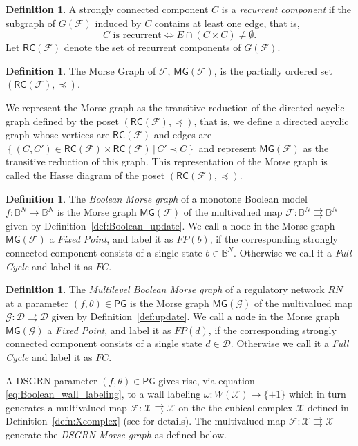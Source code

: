 \documentclass[12pt, notitlepage]{amsart}
\newcommand{\setdef}[2]{\left\{{#1}\,\left|\,{#2}\right.\right\}}
\newcommand{\cD}{\mathcal{D}}
\newcommand{\cF}{{\mathcal F}}
\newcommand{\cG}{{\mathcal G}}
\newcommand{\cX}{{\mathcal X}}
\theoremstyle{definition}
\newtheorem{defn}[thm]{Definition}
\newcommand{\PG}{\mathsf{PG}}
\newcommand{\bbB}{\mathbb{B}}
\newcommand{\RC}{\mathsf{RC}}
\newcommand{\MG}{\mathsf{MG}}
\begin{document}
  \begin{defn}
    A strongly connected component $C$ is a \emph{recurrent component} if the subgraph of $G(\cF)$ induced by $C$ contains at least one edge, that is,
    \[
      C \text{ is recurrent} \iff E \cap (C \times C) \neq \emptyset.
    \]
    Let $\RC(\cF)$ denote the set of recurrent components of $G(\cF)$.
  \end{defn}

  \begin{defn}
    The Morse Graph of $\cF$, $\MG(\cF)$, is the partially ordered set $(\RC(\cF), \preceq)$.
  \end{defn}

  We represent the Morse graph as the transitive reduction of the directed acyclic graph defined by the poset $(\RC(\cF), \preceq)$, that is, we define a directed acyclic graph whose vertices are $\RC(\cF)$ and edges are $\setdef{(C, C') \in \RC(\cF) \times \RC(\cF)}{C' \prec C}$ and represent $\MG(\cF)$ as the transitive reduction of this graph. This representation of the Morse graph is called the Hasse diagram of the poset $(\RC(\cF),\preceq)$.

  \begin{defn}
    \label{def:Boolean_MG}
    The \emph{Boolean Morse graph} of a monotone Boolean model $f \colon \bbB^N \to \bbB^N$ is the Morse graph $\MG(\cF)$ of the multivalued map $\cF \colon \bbB^N \rightrightarrows \bbB^N$ given by Definition~\ref{def:Boolean_update}. We call a node in the Morse graph $\MG(\cF)$ a \emph{Fixed Point}, and label it as $FP(b)$, if the corresponding strongly connected component consists of a single state $b \in \bbB^N$. Otherwise we call it a \emph{Full Cycle} and label it as $FC$.
  \end{defn}

  \begin{defn}
    \label{def:multi_Boolean_MG}
    The \emph{Multilevel Boolean Morse graph} of a regulatory network $RN$ at a parameter $(f, \theta) \in \PG$ is the Morse graph $\MG(\cG)$ of the multivalued map $\cG \colon \cD \rightrightarrows \cD$ given by Definition~\ref{def:update}. We call a node in the Morse graph $\MG(\cG)$ a \emph{Fixed Point}, and label it as $FP(d)$, if the corresponding strongly connected component consists of a single state $d \in \cD$. Otherwise we call it a \emph{Full Cycle} and label it as $FC$.
  \end{defn}

  A DSGRN parameter $(f, \theta) \in \PG$ gives rise, via equation \eqref{eq:Boolean_wall_labeling}, to a wall labeling $\omega \colon W(\cX) \to \{ \pm 1\}$ which in turn generates a multivalued map $\cF \colon \cX \rightrightarrows \cX$ on the the cubical complex $\cX$ defined in Definition~\ref{defn:Xcomplex} (see \cite{rook_field:24} for details). The multivalued map $\cF \colon \cX \rightrightarrows \cX$ generate the \emph{DSGRN Morse graph} as defined below.
\end{document}
